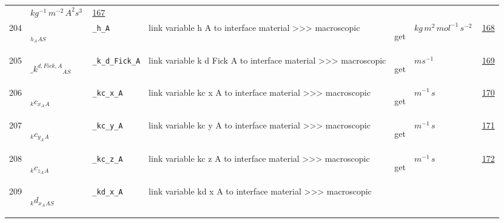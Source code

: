 \begin{longtable}{|p{1cm}|p{2.5cm}|p{4.5cm}|p{8cm}|p{3.0cm}|p{3cm}|p{1cm}|}
             & $ kg^{-1} \,m^{-2} \,A^{2} s^{3} \, $
             &                 \hyperlink{"e:167"}{ 167 }
                 \\
            204
             & \hypertarget{"v:204"}{ $ {_h_A}{_{{A S}}} $}
             & \verb|_h_A|
             & link variable h A to interface material >>> macroscopic
             & \begin{lay}get \end{lay}
             & $ kg \,m^{2} \,mol^{-1} \,s^{-2} \, $
             &                 \hyperlink{"e:168"}{ 168 }
                 \\
            205
             & \hypertarget{"v:205"}{ $ {{\_k^{d,Fick,A}}}{_{{A S}}} $}
             & \verb|_k_d_Fick_A|
             & link variable k d Fick A to interface material >>> macroscopic
             & \begin{lay}get \end{lay}
             & $ m s^{-1} \, $
             &                 \hyperlink{"e:169"}{ 169 }
                 \\
            206
             & \hypertarget{"v:206"}{ $ {_kc_x_A}{_{A}} $}
             & \verb|_kc_x_A|
             & link variable kc x A to interface material >>> macroscopic
             & \begin{lay}get \end{lay}
             & $ m^{-1} \,s \, $
             &                 \hyperlink{"e:170"}{ 170 }
                 \\
            207
             & \hypertarget{"v:207"}{ $ {_kc_y_A}{_{A}} $}
             & \verb|_kc_y_A|
             & link variable kc y A to interface material >>> macroscopic
             & \begin{lay}get \end{lay}
             & $ m^{-1} \,s \, $
             &                 \hyperlink{"e:171"}{ 171 }
                 \\
            208
             & \hypertarget{"v:208"}{ $ {_kc_z_A}{_{A}} $}
             & \verb|_kc_z_A|
             & link variable kc z A to interface material >>> macroscopic
             & \begin{lay}get \end{lay}
             & $ m^{-1} \,s \, $
             &                 \hyperlink{"e:172"}{ 172 }
                 \\
            209
             & \hypertarget{"v:209"}{ $ {_kd_x_A}{_{{A S}}} $}
             & \verb|_kd_x_A|
             & link variable kd x A to interface material >>> macroscopic

\end{longtable}
